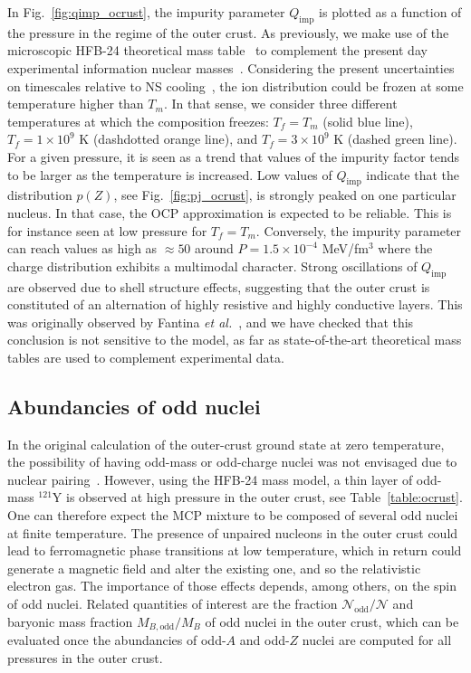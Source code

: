 In Fig.~\ref{fig:qimp_ocrust}, the impurity parameter $Q_{\text{imp}}$ is 
plotted as a function of the pressure in the regime of the outer crust. As
previously, we make use of the microscopic HFB-24 theoretical mass
table~\cite{Goriely2013} to complement the present day experimental
information nuclear masses~\cite{Huang2017,Welker2017}.
Considering the present uncertainties on timescales relative to NS 
cooling~\cite{Goriely2011}, the ion distribution could be frozen at some
temperature higher than $T_m$.
In that sense, we consider three different temperatures at which the 
composition freezes: $T_f = T_m$ (solid blue line), $T_f = 1\times 10^9$ K 
(dashdotted orange line), and $T_f = 3\times 10^9$ K (dashed green line).
For a given pressure, it is seen as a trend that values of the impurity factor
tends to be larger as the temperature is increased.
Low values of $Q_{\text{imp}}$ indicate that the distribution $p(Z)$, see
Fig.~\ref{fig:pj_ocrust}, is strongly peaked on one particular nucleus. In that 
case, the OCP approximation is expected to be reliable. This is for instance
seen at low pressure for $T_f = T_m$. Conversely, the impurity parameter 
can reach values as high as $\approx 50$ around $P=1.5\times 10^{-4}$ 
MeV/fm$^3$ where the charge distribution exhibits a multimodal 
character. 
Strong oscillations of $Q_{\text{imp}}$ are observed due to shell structure
effects, suggesting that the outer crust is constituted of an alternation of 
highly resistive and highly conductive layers. This was originally observed
by Fantina \textit{et al.}~\cite{Fantina2020}, and we have checked 
that this conclusion is not sensitive to the model, as far as state-of-the-art
theoretical mass tables are used to complement experimental data.

\subsection{Abundancies of odd nuclei}\label{subsec:odd_ocrust}

In the original calculation of the outer-crust ground state at zero 
temperature, the possibility of having odd-mass or odd-charge nuclei was not 
envisaged due to nuclear pairing~\cite{BPS}.
However, using the HFB-24 mass model, a thin layer of odd-mass $^{121}$Y is 
observed at high pressure in the outer crust, see Table~\ref{table:ocrust}.
One can therefore expect the MCP mixture to be composed of several odd nuclei
at finite temperature.
%
The presence of unpaired nucleons in the outer crust could lead to
ferromagnetic phase transitions at low temperature, which in return could 
generate a magnetic field and alter the existing one, and so the relativistic
electron gas. The importance of those effects depends, among others, on the 
spin of odd nuclei.
%
Related quantities of interest are the fraction 
$\mathcal{N}_{\text{odd}}/\mathcal{N}$ and baryonic mass fraction 
$M_{B,\text{odd}}/M_B$ of odd nuclei in the outer crust, which can be evaluated 
once the abundancies of odd-$A$ and odd-$Z$ nuclei are computed for all 
pressures in the outer crust.
 
